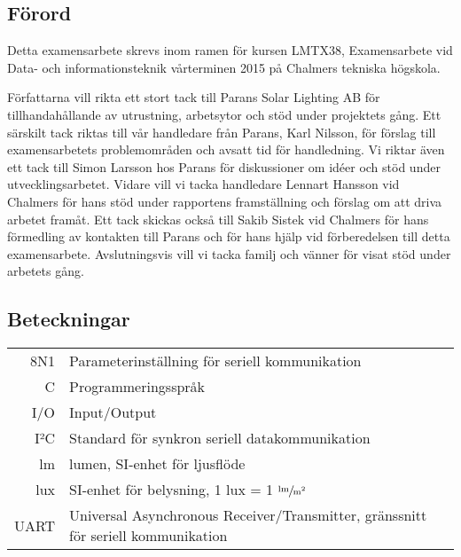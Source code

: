 \newpage
\subsection*{Förord} %
\label{sub:f_rord}
    Detta examensarbete skrevs inom ramen för kursen LMTX38, Examensarbete vid Data- och informationsteknik vårterminen 2015 på Chalmers tekniska högskola. \bigskip

    Författarna vill rikta ett stort tack till Parans Solar Lighting AB för tillhandahållande av utrustning, arbetsytor och stöd under projektets gång. Ett särskilt tack riktas till vår handledare från Parans, Karl Nilsson, för förslag till examensarbetets problemområden och avsatt tid för handledning. Vi riktar även ett tack till Simon Larsson hos Parans för diskussioner om idéer och stöd under utvecklingsarbetet. Vidare vill vi tacka handledare Lennart Hansson vid Chalmers för hans stöd under rapportens framställning och förslag om att driva arbetet framåt. Ett tack skickas också till Sakib Sistek vid Chalmers för hans förmedling av kontakten till Parans och för hans hjälp vid förberedelsen till detta examensarbete. Avslutningsvis vill vi tacka familj och vänner för visat stöd under arbetets gång.


\newpage

\subsection*{Beteckningar} %
\label{sub:beteckningar}
    \begin{tabularx}{\textwidth}{@{}rX}
        8N1 & Parameterinställning för seriell kommunikation \\
        C & Programmeringsspråk \\
        I/O & Input/Output \\
        I²C & Standard för synkron seriell datakommunikation \\
        lm & lumen, SI-enhet för ljusflöde \\
        lux & SI-enhet för belysning, 1 lux = 1 $\sfrac{\text{lm}}{\text{m}^2}$ \\
        UART & Universal Asynchronous Receiver/Transmitter, \newline gränssnitt för seriell kommunikation
        
    \end{tabularx}
